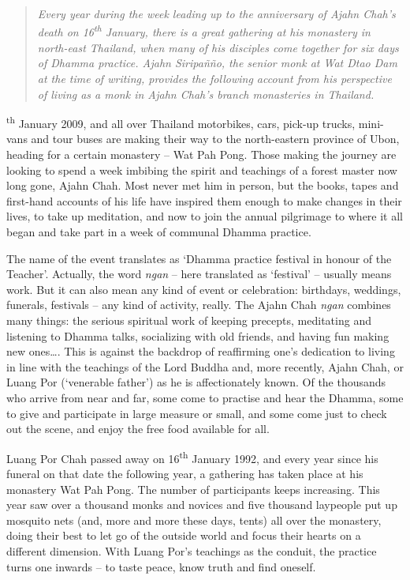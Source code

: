 
\begin{quote}\itshape
Every year during the week leading up to the anniversary of Ajahn
Chah's death on 16\textsuperscript{th} January, there is a great
gathering at his monastery in north-east Thailand, when many of his
disciples come together for six days of Dhamma practice. Ajahn
Siripañño, the senior monk at Wat Dtao Dam at the time of writing, provides the
following account from his perspective of living as a monk in Ajahn
Chah's branch monasteries in Thailand.
\end{quote}

\textsuperscript{th} January 2009, and all over Thailand motorbikes,
cars, pick-up trucks, mini-vans and tour buses are making their way to
the north-eastern province of Ubon, heading for a certain monastery --
Wat Pah Pong. Those making the journey are looking to spend a week
imbibing the spirit and teachings of a forest master now long gone,
Ajahn Chah. Most never met him in person, but the books, tapes and
first-hand accounts of his life have inspired them enough to make changes
in their lives, to take up meditation, and now to join the annual
pilgrimage to where it all began and take part in a week of communal
Dhamma practice. 

The name of the event translates as `Dhamma practice festival in honour
of the Teacher'. Actually, the word \emph{ngan} -- here translated as
`festival' -- usually means work. But it can also mean any kind of event
or celebration: birthdays, weddings, funerals, festivals -- any kind of
activity, really. The Ajahn Chah \emph{ngan} combines many things: the
serious spiritual work of keeping precepts, meditating and listening to
Dhamma talks, socializing with old friends, and having fun making new
ones\ldots{}. This is against the backdrop of reaffirming one's
dedication to living in line with the teachings of the Lord Buddha and, 
more recently, Ajahn Chah, or Luang Por (`venerable father') as he is
affectionately known. Of the thousands who arrive from near and far, 
some come to practise and hear the Dhamma, some to give and participate
in large measure or small, and some come just to check out the scene, 
and enjoy the free food available for all. 

Luang Por Chah passed away on 16\textsuperscript{th} January 1992, and every year since
his funeral on that date the following year, a gathering has taken place
at his monastery Wat Pah Pong. The number of participants keeps
increasing. This year saw over a thousand monks and novices and five
thousand laypeople put up mosquito nets (and, more and more these days, 
tents) all over the monastery, doing their best to let go of the outside
world and focus their hearts on a different dimension. With Luang Por's
teachings as the conduit, the practice turns one inwards -- to taste
peace, know truth and find oneself. 

